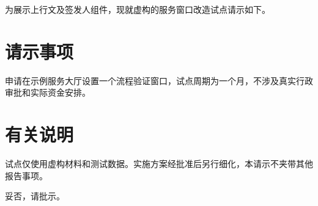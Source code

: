 \documentclass{sysuredhead}
\begin{document}
\RedHeadMakeHead

为展示上行文及签发人组件，现就虚构的服务窗口改造试点请示如下。

\section{请示事项}

申请在示例服务大厅设置一个流程验证窗口，试点周期为一个月，不涉及真实行政审批和实际资金安排。

\section{有关说明}

试点仅使用虚构材料和测试数据。实施方案经批准后另行细化，本请示不夹带其他报告事项。

妥否，请批示。

\RedHeadMakeClosing
\RedHeadMakeImprint
\end{document}
